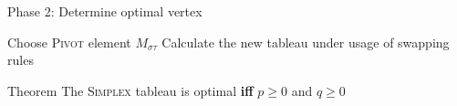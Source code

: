 \documentclass[10pt]{beamer}
\begin{document}
%	

\begin{frame}{Phase 2: Determine optimal vertex}
	\begin{algorithm}[H]
		\caption{Phase 2: Determine optimal vertex}
		\label{alg:seq}
		\begin{algorithmic}[1]
			\STATE Choose \textsc{Pivot} element $ M_{\sigma \tau} $
			\STATE Calculate the new tableau under usage of swapping rules
			\ENDWHILE
		\end{algorithmic}
	\end{algorithm}
	\pause
	\begin{alertblock}{Theorem}
		The \textsc{Simplex} tableau is optimal \textbf{iff} $ p \geq 0 $ and $ q \geq 0 $
	\end{alertblock}
\end{frame}
\end{document}

